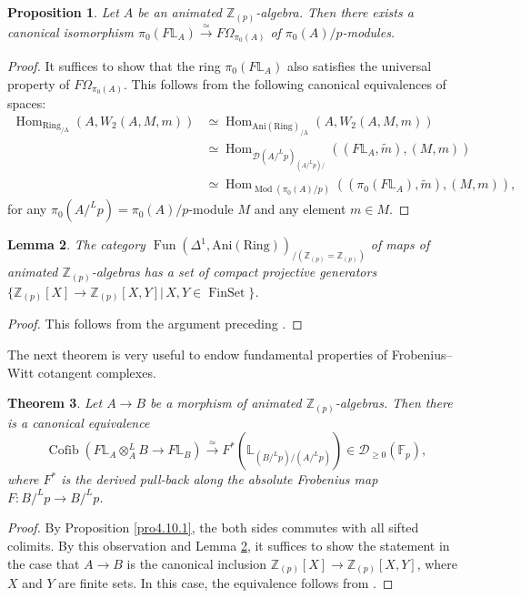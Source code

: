 \documentclass[11pt, a4paper]{amsart}
\theoremstyle{plain}
\newtheorem{theorem}{Theorem}[section]
\newtheorem{lemma}[theorem]{Lemma}
\newtheorem{prop}[theorem]{Proposition}
\theoremstyle{definition}
\begin{document}
\begin{prop}\label{pro5.1}
    Let $A$ be an animated $\mathbb Z_{(p)}$-algebra. Then there exists a canonical isomorphism $\pi_0(F\mathbb L_A)\xrightarrow[]{\simeq} F\Omega_{\pi_0(A)}$ of $\pi_0(A)/p$-modules.
\end{prop}
\begin{proof}
    It suffices to show that the ring $\pi_0(F\mathbb L_A)$ also satisfies the universal property of $F\Omega_{\pi_0(A)}$. This follows from the following canonical equivalences of spaces:
    \begin{align*}
    \operatorname{Hom}_{\operatorname{Ring_{/A}}}(A,W_2(A,M,m))&\simeq \operatorname{Hom}_{\operatorname{Ani(Ring)_{/A}}}(A,W_2(A,M,m))\\&\simeq \operatorname{Hom}_{\mathcal D(A/^Lp)_{(A/^Lp)/}}((F\mathbb L_A,\widetilde m),(M,m))\\&\simeq \operatorname{Hom}_{\operatorname{Mod}(\pi_0(A)/p)}((\pi_0(F\mathbb L_A),\widetilde m),(M,m)), 
    \end{align*}
   for any $\pi_0(A/^Lp)=\pi_0(A)/p$-module $M$ and any element $m\in M$.
\end{proof}



\begin{lemma}\label{lem5.4}
    The category $\operatorname{Fun}(\Delta^1,\operatorname{Ani(Ring)})_{/(\mathbb Z_{(p)}=\mathbb Z_{(p)})}$ of maps of animated $\mathbb Z_{(p)}$-algebras has a set of compact projective generators $\{\mathbb Z_{(p)}[X]\to \mathbb Z_{(p)}[X,Y]|\,X,Y\in \operatorname{FinSet}\}$.
\end{lemma}
\begin{proof}
    This follows from the argument preceding \cite[Definition 2.33]{Mao24}.
\end{proof}
The next theorem is very useful to endow fundamental properties of Frobenius--Witt cotangent complexes.
\begin{theorem}\label{thm5.5}
    Let $A\to B$ be a morphism of animated $\mathbb Z_{(p)}$-algebras. Then there is a canonical equivalence\[\operatorname{Cofib}(F\mathbb L_A\otimes_A^LB\to F\mathbb L_B)\xrightarrow[]{\simeq }F^*(\mathbb L_{(B/^Lp)/(A/^Lp)})\in \mathcal D_{\ge0}(\mathbb F_p),\] where $F^*$ is the derived pull-back along the absolute Frobenius map $F:B/^Lp\to B/^Lp$.
\end{theorem}
\begin{proof}
    By Proposition \ref{pro4.10.1}, the both sides commutes with all sifted colimits. By this observation and Lemma \ref{lem5.4}, it suffices to show the statement in the case that $A\to B$ is the canonical inclusion $\mathbb Z_{(p)}[X]\to \mathbb Z_{(p)}[X,Y]$, where $X$ and $Y$ are finite sets. In this case, the equivalence follows from \cite[Proposition 2.10.1]{Sai22}.
\end{proof}
\end{document}
